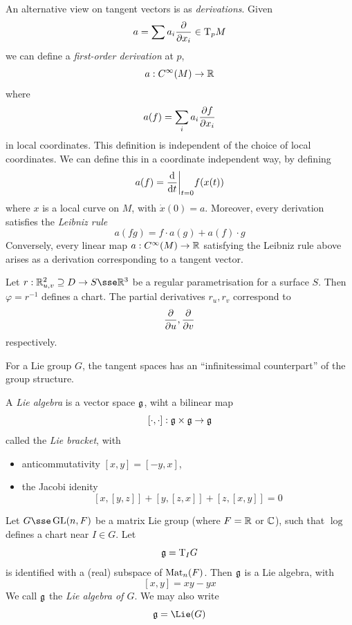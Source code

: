 \documentclass{article}
\begin{document}
An alternative view on tangent vectors is as \emph{derivations}. Given
\[a = \sum a_i \pdv{x_i} \in \mathrm{T}_pM\]
we can define a \emph{first-order derivation} at \(p\),
\[a : C^\infty(M) \to \mathbb{R}\]
where
\[a(f) = \sum_i a_i \pdv{f}{x_i}\]
in local coordinates. This definition is independent of the choice of local coordinates. We can define this in a coordinate independent way, by defining
\[a(f) = \dv{t}\bigg\vert_{t=0}f(x(t))\]
where \(x\) is a local curve on \(M\), with \(\dot x(0) = a\). Moreover, every derivation satisfies the \emph{Leibniz rule}
\[a(fg) = f \cdot a(g) + a(f) \cdot g\]
Conversely, every linear map \(a : C^\infty(M) \to \mathbb{R}\) satisfying the Leibniz rule above arises as a derivation corresponding to a tangent vector.

\begin{example}
    Let \(r : \R^2_{u, v}\supseteq D \to S \sse \R^3\) be a regular parametrisation for a surface \(S\). Then \(\varphi = r^{-1}\) defines a chart. The partial derivatives \(r_u, r_v\) correspond to
    \[\pdv{u}, \pdv{v}\]
    respectively.
\end{example}

For a Lie group \(G\), the tangent spaces has an ``infinitessimal counterpart'' of the group structure.

\begin{definition}
     A \emph{Lie algebra} is a vector space \(\mathfrak{g}\), wiht a bilinear map
    \[[\cdot, \cdot] : \mathfrak{g} \times \mathfrak{g} \to \mathfrak{g}\]
    called the \emph{Lie bracket}, with
    \begin{itemize}
        \item anticommutativity \([x, y] = [-y, x]\),
        \item the Jacobi idenity
        \[[x,[y,z]] + [y, [z,x]] + [z, [x, y]] = 0\]
    \end{itemize}
\end{definition}

\begin{theorem}
    Let \(G \sse \GL(n, F)\) be a matrix Lie group (where \(F = \mathbb{R}\) or \(\mathbb{C}\)), such that \(\log\) defines a chart near \(I \in G\). Let
    \[\mathfrak{g} = \mathrm{T}_IG\]
    is identified with a (real) subspace of \(\operatorname{Mat}_n(F)\). Then \(\mathfrak{g}\) is a Lie algebra, with
    \[[x,y] = xy-yx\]
    We call \(\mathfrak{g}\) the \emph{Lie algebra of \(G\)}. We may also write
    \[\mfg = \Lie(G)\]
\end{theorem}
\end{document}
